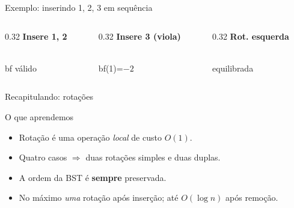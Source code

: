 \documentclass[aspectratio=169]{beamer}
\begin{document}
\begin{frame}{Exemplo: inserindo 1, 2, 3 em sequência}
  \begin{columns}[T]
    \begin{column}{0.32\textwidth}
      \centering \textbf{Insere 1, 2}\\
      \\
      \scriptsize bf válido
    \end{column}
    \begin{column}{0.32\textwidth}
      \centering \textbf{Insere 3 (viola)}\\
      \\
      \scriptsize bf(1)=$-2$
    \end{column}
    \begin{column}{0.32\textwidth}
      \centering \textbf{Rot. esquerda}\\
      \\
      \scriptsize equilibrada \checkmark
    \end{column}
  \end{columns}
\end{frame}

\begin{frame}{Recapitulando: rotações}
  \begin{block}{O que aprendemos}
    \begin{itemize}
      \item Rotação é uma operação \emph{local} de custo $O(1)$.
      \item Quatro casos $\Rightarrow$ duas rotações simples e duas duplas.
      \item A ordem da BST é \textbf{sempre} preservada.
      \item No máximo \emph{uma} rotação após inserção;
            até $O(\log n)$ após remoção.
    \end{itemize}
  \end{block}
\end{frame}
\end{document}
